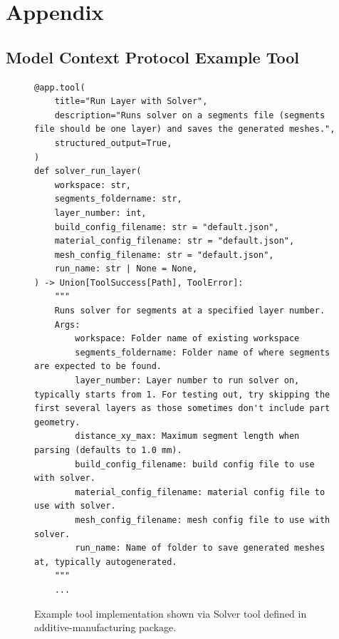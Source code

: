 
\section{Appendix}
\subsection{Model Context Protocol Example Tool}
\label{apx:example_tool}

\begin{figure}[htbp]
\centering
\begin{minipage}{\linewidth}
\begin{lstlisting}[style=mypython]
@app.tool(
    title="Run Layer with Solver",
    description="Runs solver on a segments file (segments file should be one layer) and saves the generated meshes.",
    structured_output=True,
)
def solver_run_layer(
    workspace: str,
    segments_foldername: str,
    layer_number: int,
    build_config_filename: str = "default.json",
    material_config_filename: str = "default.json",
    mesh_config_filename: str = "default.json",
    run_name: str | None = None,
) -> Union[ToolSuccess[Path], ToolError]:
    """
    Runs solver for segments at a specified layer number.
    Args:
        workspace: Folder name of existing workspace
        segments_foldername: Folder name of where segments are expected to be found.
        layer_number: Layer number to run solver on, typically starts from 1. For testing out, try skipping the first several layers as those sometimes don't include part geometry.
        distance_xy_max: Maximum segment length when parsing (defaults to 1.0 mm).
        build_config_filename: build config file to use with solver.
        material_config_filename: material config file to use with solver.
        mesh_config_filename: mesh config file to use with solver.
        run_name: Name of folder to save generated meshes at, typically autogenerated.
    """
    ...
\end{lstlisting}
\caption{Example tool implementation shown via Solver tool defined in additive-manufacturing package.}
\label{fig:mcp_tool_example}
\end{minipage}
\end{figure}

